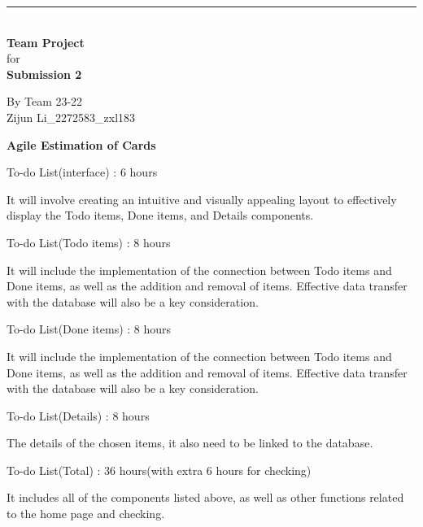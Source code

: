 \documentclass[peerreview]{IEEEtran}
\begin{document}

\begin{titlepage}
	
	\rule{\linewidth}{5pt}
	\raggedleft
	\fontsize{38pt}{50pt}\selectfont
    \textbf{\\Team Project\\}
    \fontsize{28pt}{60pt}\selectfont 
    for\\
    \fontsize{38pt}{60pt}\selectfont 
    \textbf{Submission 2\\}
	
	\vfill %
	
	
	\parbox[t]{0.93\textwidth}{ %
		\raggedleft %
		\large %
		{\Large By Team 23-22}\\[4pt] %
		Zijun Li\_2272583\_zxl183\\
	}
	
\end{titlepage}

\newpage

{\Large\bf{Agile Estimation of Cards}}\\

\begin{itemize}
  {\bf\item To-do List(interface)  : 6 hours }
  \subitem It will involve creating an intuitive and visually appealing layout to effectively display the Todo items, Done items, and Details components.
  {\bf\item To-do List(Todo items) : 8 hours}
  \subitem It will include the implementation of the connection between Todo items and Done items, as well as the addition and removal of items. Effective data transfer with the database will also be a key consideration.
  {\bf\item To-do List(Done items) : 8 hours}
  \subitem It will include the implementation of the connection between Todo items and Done items, as well as the addition and removal of items. Effective data transfer with the database will also be a key consideration.
  {\bf\item To-do List(Details)    : 8 hours}
  \subitem The details of the chosen items, it also need to be linked to the database. 
  {\bf\item To-do List(Total)      : 36 hours(with extra 6 hours for checking)}
  \subitem  It includes all of the components listed above, as well as other functions related to the home page and checking.
\end{itemize}
\end{document}
